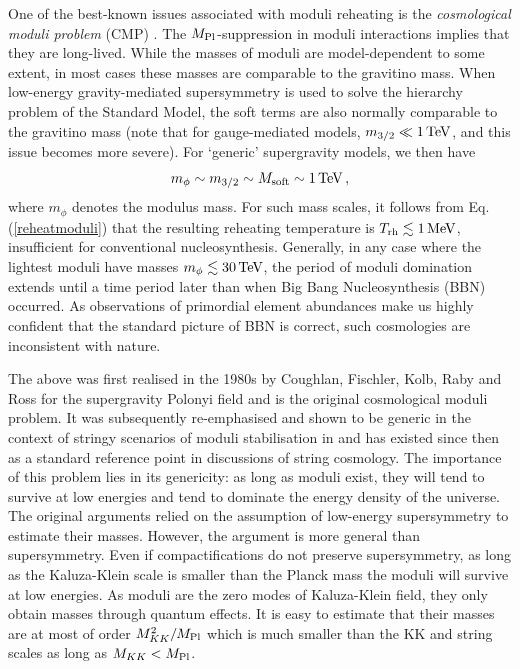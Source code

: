 One of the best-known issues associated with moduli reheating is the \emph{cosmological moduli problem} (CMP) \cite{CoughlanRoss, hepph9308292, hepph9308325}. The $M_{\rm Pl}$-suppression in moduli interactions implies that they are long-lived. While the masses of moduli are model-dependent to some extent, in most cases these masses are comparable to the gravitino mass. When low-energy gravity-mediated supersymmetry is used to solve the hierarchy problem of the Standard Model, the soft terms are also normally comparable to the gravitino mass (note that for gauge-mediated models, $m_{3/2} \ll 1\, {\rm TeV}$, and this issue becomes more severe). For `generic' supergravity models, we then have
\begin{equation}
m_\phi \sim m_{3/2} \sim M_{\rm soft} \sim 1 \,{\rm TeV}\,,
\end{equation}
where $m_\phi$ denotes the modulus mass. For such mass scales, it
follows from Eq. (\ref{reheatmoduli}) that the resulting reheating temperature is $T_{\rm rh} \lesssim 1 \, {\rm MeV}$, insufficient for conventional nucleosynthesis. Generally, in any case where the lightest moduli have masses $m_\phi \lesssim 30\, \hbox{TeV}$, the period of moduli domination extends until a time period later than when Big Bang Nucleosynthesis (BBN) occurred. 
As observations of primordial element abundances make us highly confident that the standard picture of BBN is correct, such cosmologies are inconsistent with nature.

The above was first realised in the 1980s by Coughlan, Fischler, Kolb, Raby and Ross \cite{CoughlanRoss} for the supergravity Polonyi field and is the original cosmological moduli problem. It was subsequently re-emphasised and shown to be generic in the context of stringy scenarios of moduli stabilisation in \cite{hepph9308292, hepph9308325} and has existed since then as a standard reference point in discussions of string cosmology. The importance of this problem lies in its genericity: as long as moduli exist, they will tend to survive at low energies and tend to dominate the energy density of the universe. The original arguments relied on the assumption of low-energy supersymmetry to estimate their masses. However, the argument is more general than supersymmetry. Even if compactifications do not preserve supersymmetry, as long as the Kaluza-Klein scale is smaller than the Planck mass the moduli will survive at low energies. As moduli are the zero modes of Kaluza-Klein field, they only obtain masses through quantum effects. It is easy to estimate that their masses are at most of order $M_{KK}^2/M_{\rm Pl}$ \cite{Burgess:2010sy} which is much smaller than the KK and string scales as long as $M_{KK}<M_{\rm Pl}$.

